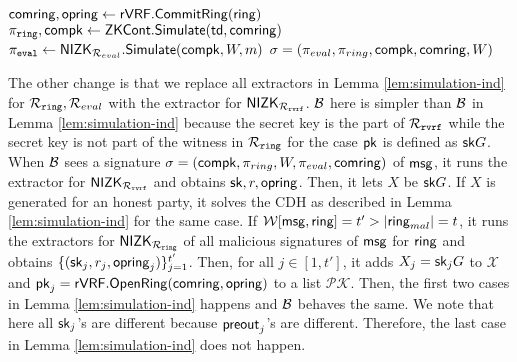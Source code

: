 	\begin{algorithm}
	\caption{$\gen_{sign}(\ring,W,\pk,\aux,m)$}
	\label{alg:gensignSGbdv}	 	
	\begin{algorithmic}[1]
		\State $ \mathsf{comring}, \mathsf{opring} \leftarrow {\ensuremath{\mathsf{rVRF}}}.{\mathsf{CommitRing}}(\mathsf{ring}) $
		\State $ \pi_{\mathtt{ring}},\mathsf{compk} \leftarrow {\ensuremath{\mathsf{ZKCont}}}.{\mathsf{Simulate}}(\mathsf{td},\mathsf{comring}) $ 
		\State $ \pi_{\mathtt{eval}} \leftarrow {\ensuremath{\mathsf{NIZK}}}_{\mathcal{R}_{eval}}.{\mathsf{Simulate}}(\mathsf{compk}, W,m) $
		\State\Return$ \sigma = (\pi_{eval},\pi_{ring},\mathsf{compk},\mathsf{comring},W) $
	\end{algorithmic}
	
\end{algorithm}

The other change is that we replace all extractors in Lemma \ref{lem:simulation-ind} for $ \mathcal{R}_{\mathtt{ring}}, \mathcal{R}_{eval} $ with the extractor  for $ {\mathsf{NIZK}}_{\mathcal{R}_{\mathtt{rvrf}}} $. $ \mathcal{B} $ here is simpler than $ \mathcal{B}$ in Lemma \ref{lem:simulation-ind} because the secret key is the part of  $\mathcal{R}_{\mathtt{rvrf}}$ while the secret key is not part of the witness in $ \mathcal{R}_{\mathtt{ring}} $ for the case $ \mathsf{pk} $ is defined as $ \mathsf{sk}G $.
When $ \mathcal{B} $ sees a signature $ \sigma = (\mathsf{compk}, \pi_{ring}, W, \pi_{eval}, \mathsf{comring}) $ of $ \mathsf{msg} $, it runs the extractor for $ {\mathsf{NIZK}}_{\mathcal{R}_{\mathtt{rvrf}}} $ and obtains $ \mathsf{sk},r, \mathsf{opring} $. Then, it lets $ X $ be $ \mathsf{sk}G $. If $ X $ is generated for an honest party, it solves the CDH as described in Lemma \ref{lem:simulation-ind} for the same case. If $ \mathcal{W}[\mathsf{msg},\mathsf{ring}] = t' > |\mathsf{ring}_{mal}| = t$, it runs the extractors for $ {\mathsf{NIZK}}_{\mathcal{R}_{\mathtt{ring}}} $ of all malicious signatures of $ \mathsf{msg} $ for $ \mathsf{ring} $ and obtains $ \{(\mathsf{sk}_j,r_j,\mathsf{opring}_j)\}_{j = 1}^{t'}$. Then, for all $ j \in [1,t']$, it adds $ X_j = \mathsf{sk}_j G $ to $ \mathcal{X} $ and $ \mathsf{pk}_j  = {\mathsf{rVRF}}.{\mathsf{OpenRing}}(\mathsf{comring},\mathsf{opring})$ to a list $ \mathcal{PK} $. Then, the first two cases in Lemma \ref{lem:simulation-ind} happens and $ \mathcal{B} $ behaves the same.
We note that here all $ \mathsf{sk}_j $'s are different because $ {\mathsf{preout}}_j $'s are different. Therefore, the last case in Lemma  \ref{lem:simulation-ind} does not happen.


 
